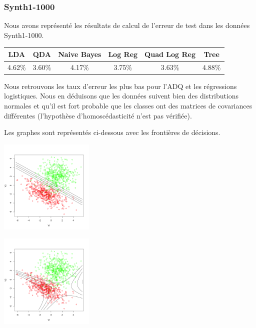 \documentclass[10pt]{article}
\begin{document}
\subsubsection{Synth1-1000}
Nous avons représenté les résultats de calcul de l'erreur de test dans les données Synth1-1000. 
\begin{center}
	\begin{tabular}{|c | c | c| c| c| c|}
		\hline
		LDA & QDA & Naive Bayes & Log Reg & Quad Log Reg & Tree\\
		\hline	
		4.62\% & 3.60\% & 4.17\% & 3.75\% & 3.63\% & 4.88\%
	\end{tabular}
\end{center}
Nous retrouvons les taux d'erreur les plus bas pour l'ADQ et les régressions logistiques. Nous en déduisons que les données suivent bien des distributions normales et qu'il est fort probable que les classes ont des matrices de covariances différentes (l'hypothèse d'homoscédasticité n'est pas vérifiée). 

Les graphes sont représentés ci-dessous avec les frontières de décisions.

\begin{minipage}{.5\textwidth}
	\includegraphics[width=45mm]{Figures/synth1_lda.png}
\end{minipage}%
\hspace{0.02\linewidth}
\begin{minipage}{.5\textwidth}
	\includegraphics[width=45mm]{Figures/synth1_qda.png}
\end{minipage}
\end{document}
